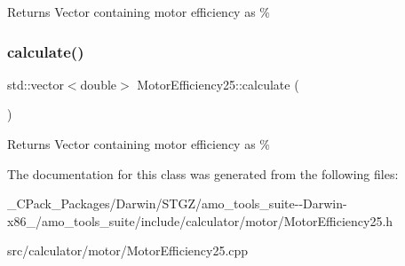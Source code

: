 \begin{DoxyReturn}{Returns}
Vector containing motor efficiency as \% 
\end{DoxyReturn}
\mbox{\label{class_motor_efficiency25_a2d7f63fa902f9930f667b779950ffb44}} 
\subsubsection{\texorpdfstring{calculate()}{calculate()}\hspace{0.1cm}{\footnotesize\ttfamily [3/3]}}
{\footnotesize\ttfamily std\+::vector$<$double$>$ Motor\+Efficiency25\+::calculate (\begin{DoxyParamCaption}{ }\end{DoxyParamCaption})}

\begin{DoxyReturn}{Returns}
Vector containing motor efficiency as \% 
\end{DoxyReturn}


The documentation for this class was generated from the following files\+:\begin{DoxyCompactItemize}
\item 
\+\_\+\+C\+Pack\+\_\+\+Packages/\+Darwin/\+S\+T\+G\+Z/amo\+\_\+tools\+\_\+suite-\/-\/\+Darwin-\/x86\+\_/amo\+\_\+tools\+\_\+suite/include/calculator/motor/Motor\+Efficiency25.\+h\item 
src/calculator/motor/Motor\+Efficiency25.\+cpp\end{DoxyCompactItemize}
